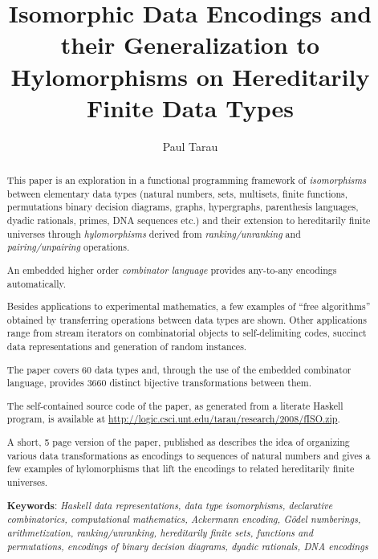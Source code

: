\documentclass[]{INCLUDES/llncs}
\title{
    Isomorphic Data Encodings %
    and their
    Generalization to Hylomorphisms on Hereditarily Finite Data Types
}
\author{Paul Tarau}
\institute{
   Department of Computer Science and Engineering\\
   University of North Texas\\
   {\em E-mail: tarau@cs.unt.edu}
}
\begin{document}
\maketitle
\date{}

\begin{abstract}
This paper is an exploration in a functional programming framework
of {\em isomorphisms} between elementary
data types (natural numbers, sets, multisets, finite functions, permutations
binary decision diagrams, graphs, hypergraphs,
parenthesis languages, dyadic
rationals, primes, DNA sequences etc.) and their extension to hereditarily
finite universes through {\em hylomorphisms} derived
from {\em ranking/unranking} and
{\em pairing/unpairing} operations.

An embedded higher order {\em combinator language} provides
any-to-any encodings automatically.

Besides applications to experimental mathematics,
a few examples of
``free algorithms'' obtained by transferring 
operations between data types 
are shown. Other applications range from
stream iterators on
combinatorial objects to
self-delimiting codes,
succinct data representations and generation
of random instances.

The paper covers 60 data types and, through the use of
the embedded combinator language, provides 3660 distinct
bijective transformations between them.

\begin{comment}
The paper is part of a larger effort to cover in a declarative programming 
paradigm some fundamental combinatorial generation algorithms
along the lines of Knuth's recent work \cite{knuth06draft}.
\end{comment}

The self-contained source code of the paper, as generated from a
literate Haskell program, is available at
\url{http://logic.csci.unt.edu/tarau/research/2008/fISO.zip}.

A short, 5 page version of the paper,
published as \cite{sac09fISO} describes
the idea of organizing various data transformations
as encodings to sequences of natural numbers and
gives a few examples of hylomorphisms that lift the
encodings to related hereditarily finite universes.

{\bf Keywords}:
{\em 
Haskell data representations,
data type isomorphisms,
declarative combinatorics,
computational mathematics,
Ackermann encoding, G\"{o}del numberings, arithmetization,
ranking/unranking, 
hereditarily finite sets, functions and permutations,
encodings of binary decision diagrams,
dyadic rationals,
DNA encodings
}
\end{abstract}
\end{document}
